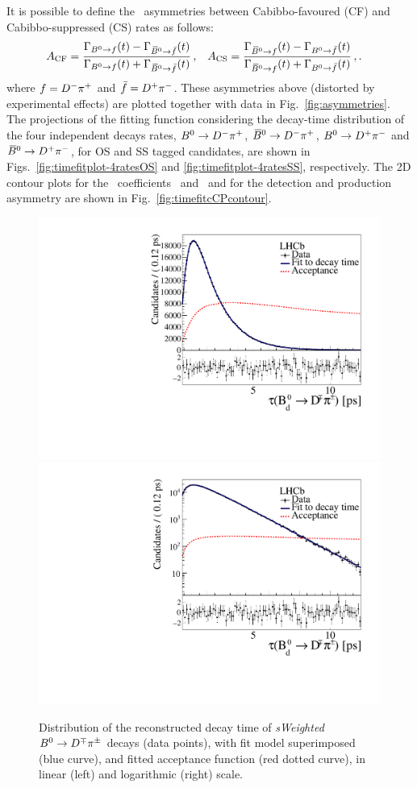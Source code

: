 It is possible to define the \CP~asymmetries between Cabibbo-favoured (CF) and Cabibbo-suppressed (CS) rates as follows:
\begin{align}
A_\text{CF}&=\frac{\Gamma_{B^0 \rightarrow f} (t) - \Gamma_{\kern 0.18em\overline{\kern -0.18em B}{}^0 \rightarrow \bar{f}} (t)}{\Gamma_{B^0 \rightarrow f} (t) + \Gamma_{\kern 0.18em\overline{\kern -0.18em B}{}^0 \rightarrow \bar{f}} (t)}\,,
& A_\text{CS}&=\frac{\Gamma_{\kern 0.18em\overline{\kern -0.18em B}{}^0 \rightarrow f} (t) - \Gamma_{B^0 \rightarrow \bar{f}} (t)}{\Gamma_{\kern 0.18em\overline{\kern -0.18em B}{}^0 \rightarrow f} (t) + \Gamma_{B^0 \rightarrow \bar{f}} (t)}\,,\label{eq:CFSAsym}.
\end{align}
where $f=D^-\pi^+$ and $\bar f=D^+\pi^-$.
These asymmetries above (distorted by experimental effects) are plotted together with data in Fig.~\ref{fig:asymmetries}.
The projections of the fitting function considering the decay-time distribution of the four independent decays rates,
$B^0 \rightarrow D^-\pi^+$,  $\kern 0.18em\overline{\kern -0.18em B}{}^0 \rightarrow D^-\pi^+$,  $B^0 \rightarrow D^+\pi^-$ and  $\kern 0.18em\overline{\kern -0.18em B}{}^0 \rightarrow D^+\pi^-$, for OS and SS
tagged candidates, 
are shown in Figs.~\ref{fig:timefitplot-4ratesOS} and \ref{fig:timefitplot-4ratesSS}, respectively.
The 2D contour plots for the \CP~coefficients \Sf~and \Sfb~and for the detection and
production asymmetry are shown in Fig.~\ref{fig:timefitcCPcontour}.
\begin{figure}[htpb]
	\begin{center}
		\includegraphics[width=0.49\linewidth]{05DecaytimeFit/figs/datafit/sFit_Bd2DPi.pdf}
                \includegraphics[width=0.49\linewidth]{05DecaytimeFit/figs/datafit/sFit_log_Bd2DPi.pdf}
	\end{center}
        \vspace{-4mm}
	\caption{Distribution of the reconstructed decay time of \emph{sWeighted} $B^0\rightarrow D^\mp\pi^\pm$ decays (data points), 
	with fit model superimposed (blue curve), and fitted acceptance function (red dotted curve), in linear (left) and logarithmic (right) scale.}
	\label{fig:timefitplot}
\end{figure}
